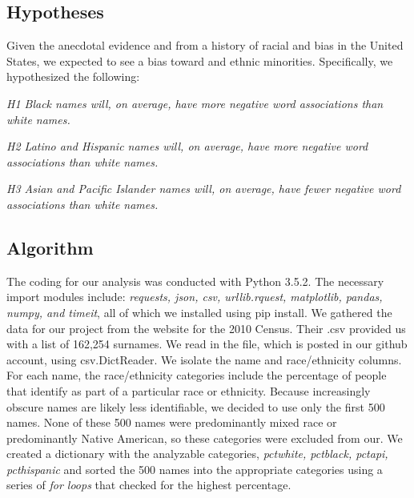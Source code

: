 \documentclass[sigconf]{acmart}
\begin{document}
\subsection{Hypotheses}

Given the anecdotal evidence and from a history of racial and bias in the United States, we expected to see a bias toward and ethnic minorities. Specifically, we hypothesized the following: \\

\vspace{2mm}

{\em H1 Black names will, on average, have more negative word associations than white names.} \\

\vspace{2mm}

{\em H2 Latino and Hispanic names will, on average, have more negative word associations than white names.} \\

\vspace{2mm}

{\em H3 Asian and Pacific Islander names will, on average, have fewer negative word associations than white names.}
\vspace{2mm}

\subsection{Algorithm}

The coding for our analysis was conducted with Python 3.5.2. The necessary import modules include: {\em requests, json, csv, urllib.rquest, matplotlib, pandas, numpy, and timeit}, all of which we installed using pip install. We gathered the data for our project from the website for the 2010 Census. Their .csv provided us with a list of 162,254 surnames. We read in the file, which is posted in our github account, using csv.DictReader. We isolate the name and race/ethnicity columns. For each name, the race/ethnicity categories include the percentage of people that identify as part of a particular race or ethnicity. Because increasingly obscure names are likely less identifiable, we decided to use only the first 500 names. None of these 500 names were predominantly mixed race or predominantly Native American, so these categories were excluded from our. We created a dictionary with the analyzable categories, {\em pctwhite, pctblack, pctapi, pcthispanic} and sorted the 500 names into the appropriate categories using a series of {\em for loops} that checked for the highest percentage. 
\end{document}
